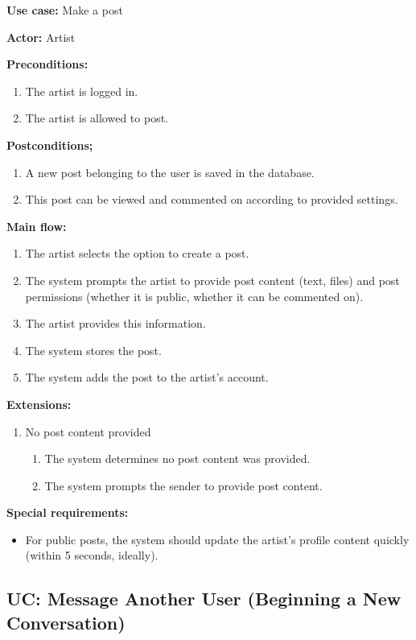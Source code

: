 \documentclass[11pt]{report}
\begin{document}
{\bfseries Use case:} Make a post

{\bfseries Actor:} Artist

{\bfseries Preconditions:}
\begin{enumerate}
	\item The artist is logged in.
	\item The artist is allowed to post.
\end{enumerate}

{\bfseries Postconditions;}
\begin{enumerate}
	\item A new post belonging to the user is saved in the database.
	\item This post can be viewed and commented on according to provided settings.
\end{enumerate}

{\bfseries Main flow:}
\begin{enumerate}
	\item The artist selects the option to create a post.
	\item The system prompts the artist to provide post content (text, files) and post permissions (whether it is public, whether it can be commented on).
	\item The artist provides this information.
	\item The system stores the post.
	\item The system adds the post to the artist's account.
\end{enumerate}

{\bfseries Extensions:}
\begin{enumerate}
	\item [4a.] No post content provided
	\begin{enumerate}
		\item [4a1.] The system determines no post content was provided.
		\item [4a2.] The system prompts the sender to provide post content.
	\end{enumerate}
\end{enumerate}

{\bfseries Special requirements:}
\begin{itemize}
	\item For public posts, the system should update the artist's profile content quickly (within 5 seconds, ideally).
\end{itemize}


\subsection{UC: Message Another User (Beginning a New Conversation)}
\end{document}
